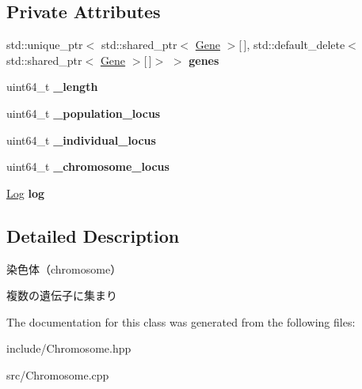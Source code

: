 \subsection*{Private Attributes}
\begin{DoxyCompactItemize}
\item 
\mbox{\label{class_g_a_1_1_chromosome_ac79e019628bfba6806367adbb0fbb67e}} 
std\+::unique\+\_\+ptr$<$ std\+::shared\+\_\+ptr$<$ \mbox{\hyperlink{class_g_a_1_1_gene}{Gene}} $>$\mbox{[}$\,$\mbox{]}, std\+::default\+\_\+delete$<$ std\+::shared\+\_\+ptr$<$ \mbox{\hyperlink{class_g_a_1_1_gene}{Gene}} $>$\mbox{[}$\,$\mbox{]}$>$ $>$ {\bfseries genes}
\item 
\mbox{\label{class_g_a_1_1_chromosome_abdd3fc9f826acee761f0a9812150ae9c}} 
uint64\+\_\+t {\bfseries \+\_\+length}
\item 
\mbox{\label{class_g_a_1_1_chromosome_a4a490e1df7294e29a614c2e252ee1d0d}} 
uint64\+\_\+t {\bfseries \+\_\+population\+\_\+locus}
\item 
\mbox{\label{class_g_a_1_1_chromosome_a23a182704349d6de8a5383c8ec690525}} 
uint64\+\_\+t {\bfseries \+\_\+individual\+\_\+locus}
\item 
\mbox{\label{class_g_a_1_1_chromosome_abdc5f6da1c5bf5ddfdfc69100a58e351}} 
uint64\+\_\+t {\bfseries \+\_\+chromosome\+\_\+locus}
\item 
\mbox{\label{class_g_a_1_1_chromosome_a3cb12b6d2aa8c78debb52a6d7693cfd9}} 
\mbox{\hyperlink{class_g_a_1_1_log}{Log}} {\bfseries log}
\end{DoxyCompactItemize}


\subsection{Detailed Description}
染色体（chromosome） 

複数の遺伝子に集まり 

The documentation for this class was generated from the following files\+:\begin{DoxyCompactItemize}
\item 
include/Chromosome.\+hpp\item 
src/Chromosome.\+cpp\end{DoxyCompactItemize}
